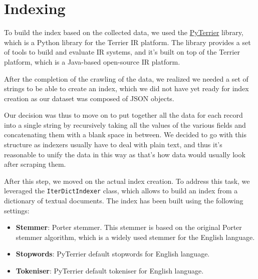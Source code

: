 \section{Indexing}

To build the index based on the collected data, we used the \href{https://github.com/terrier-org/pyterrier}{PyTerrier} library, which is a Python library for the Terrier IR platform. The library provides a set of tools to build and evaluate IR systems, and it's built on top of the Terrier platform, which is a Java-based open-source IR platform.

After the completion of the crawling of the data, we realized we needed a set of strings to be able to create an index, which we did not have yet ready for index creation as our dataset was composed of JSON objects.

Our decision was thus to move on to put together all the data for each record into a single string by recursively taking all the values of the various fields and concatenating them with a blank space in between. We decided to go with this structure as indexers usually have to deal with plain text, and thus it's reasonable to unify the data in this way as that's how data would usually look after scraping them.

After this step, we moved on the actual index creation. To address this task, we leveraged the \texttt{IterDictIndexer} class, which allows to build an index from a dictionary of textual documents. The index has been built using the following settings:

\begin{itemize}
  \item \textbf{Stemmer}: Porter stemmer. This stemmer is based on the original Porter stemmer algorithm, which is a widely used stemmer for the English language.
  \item \textbf{Stopwords}: PyTerrier default stopwords for English language.
  \item \textbf{Tokeniser}: PyTerrier default tokeniser for English language.
\end{itemize}
